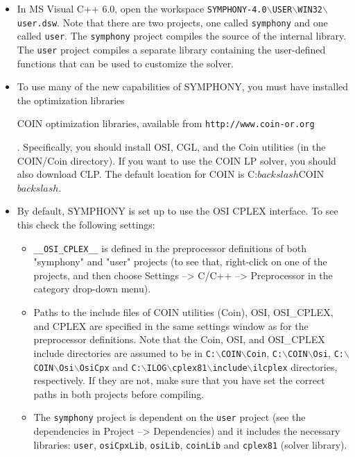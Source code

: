 \begin{itemize}

\item In MS Visual C++ 6.0, open the workspace
\texttt{SYMPHONY-4.0$\backslash$USER$\backslash$WIN32$\backslash$user.dsw}. 
Note that there are two projects, one called \texttt{symphony} and one called
\texttt{user}.  The \texttt{symphony} project compiles the source of the internal
library. The \texttt{user} project compiles a separate library containing the
user-defined functions that can be used to customize the solver.

\item To use many of the new capabilities of SYMPHONY, you must have installed
the \emph{} optimization
libraries 
\begin{latexonly} 
COIN optimization libraries, available from
\texttt{http://www.coin-or.org} 
\end{latexonly}. Specifically, you should
install OSI, CGL, and the Coin utilities (in the COIN/Coin directory). If you
want to use the COIN LP solver, you should also download CLP. The default
location for COIN is C:$backslash$COIN$backslash$.

\item By default, SYMPHONY is set up to use the OSI CPLEX interface. To see this
check the following settings:

\begin{itemize}

\item \texttt{\_\_OSI\_CPLEX\_\_} is defined in the preprocessor definitions of both
"symphony" and "user" projects (to see that, right-click on one of the
projects, and then choose Settings --> C/C++ --> Preprocessor in the category
drop-down menu).

\item Paths to the include files of COIN utilities (Coin), OSI, OSI\_CPLEX, and
CPLEX are specified in the same settings window as for the preprocessor
definitions. Note that the Coin, OSI, and OSI\_CPLEX include directories are
assumed to be in \texttt{C:$\backslash$COIN$\backslash$Coin},
\texttt{C:$\backslash$COIN$\backslash$Osi},
\texttt{C:$\backslash$COIN$\backslash$Osi$\backslash$OsiCpx} and 
\texttt{C:$\backslash$ILOG$\backslash$cplex81$\backslash$include$\backslash$ilcplex}
directories, respectively. If they are not, make sure that you have set the
correct paths in both projects before compiling.

\item The \texttt{symphony} project is dependent on the \texttt{user} project
(see the dependencies in Project --> Dependencies) and it includes the
necessary libraries: \texttt{user}, \texttt{osiCpxLib}, \texttt{osiLib},
\texttt{coinLib} and \texttt{cplex81} (solver library).


\end{itemize}
\end{itemize}
